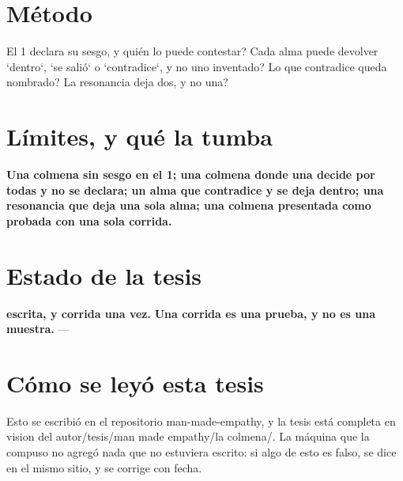 \documentclass[11pt,a4paper]{article}
\begin{document}
\section{Método}
\textquestiondown{}El 1 declara su sesgo, y quién lo puede contestar? \textquestiondown{}Cada alma puede devolver `dentro`, `se salió` o `contradice`, y no uno inventado? \textquestiondown{}Lo que contradice queda nombrado? \textquestiondown{}La resonancia deja dos, y no una?

\section{Límites, y qué la tumba}
\textbf{Una colmena sin sesgo en el 1; una colmena donde una decide por todas y no se declara; un alma que contradice y se deja dentro; una resonancia que deja una sola alma; una colmena presentada como probada con una sola corrida.}

\section{Estado de la tesis}
\textbf{escrita, y corrida una vez.} \textbf{Una corrida es una prueba, y no es una muestra.} ---

\section*{Cómo se leyó esta tesis}
Esto se escribió en el repositorio man-made-empathy, y la tesis está completa en vision del autor/tesis/man made empathy/la colmena/. La máquina que la compuso no agregó nada que no estuviera escrito: si algo de esto es falso, se dice en el mismo sitio, y se corrige con fecha.
\end{document}
